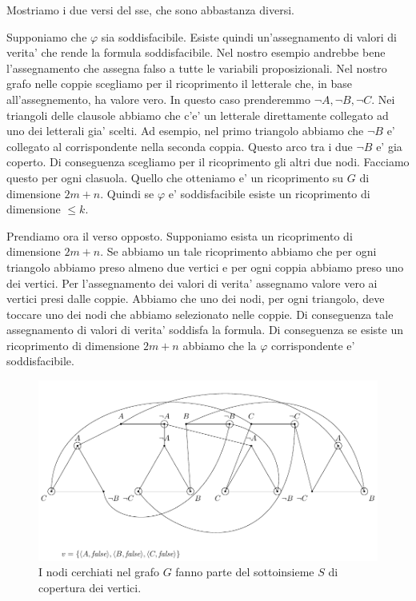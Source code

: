 Mostriamo i due versi del sse, che sono abbastanza diversi.

Supponiamo che $\varphi$ sia soddisfacibile. Esiste quindi un'assegnamento di valori di verita' che
rende la formula soddisfacibile. Nel nostro esempio andrebbe bene l'assegnamento che assegna falso a
tutte le variabili proposizionali. Nel nostro grafo nelle coppie scegliamo per il ricoprimento il
letterale che, in base all'assegnemento, ha valore vero. In questo caso prenderemmo $\lnot A, \lnot
B, \lnot C$. Nei triangoli delle clausole abbiamo che c'e' un letterale direttamente collegato ad
uno dei letterali gia' scelti. Ad esempio, nel primo triangolo abbiamo che $\lnot B$ e' collegato al
corrispondente nella seconda coppia. Questo arco tra i due $\lnot B$ e' gia coperto. Di conseguenza
scegliamo per il ricoprimento gli altri due nodi. Facciamo questo per ogni clasuola. Quello che
otteniamo e' un ricoprimento su $G$ di dimensione $2m + n$. Quindi se $\varphi$ e' soddisfacibile
esiste un ricoprimento di dimensione $\leq k$.

Prendiamo ora il verso opposto. Supponiamo esista un ricoprimento di dimensione $2m + n$. Se abbiamo
un tale ricoprimento abbiamo che per ogni triangolo abbiamo preso almeno due vertici e per ogni
coppia abbiamo preso uno dei vertici. Per l'assegnamento dei valori di verita' assegnamo valore vero
ai vertici presi dalle coppie. Abbiamo che uno dei nodi, per ogni triangolo, deve toccare uno dei
nodi che abbiamo selezionato nelle coppie. Di conseguenza tale assegnamento di valori di verita'
soddisfa la formula. Di conseguenza se esiste un ricoprimento di dimensione $2m + n$ abbiamo che la
$\varphi$ corrispondente e' soddisfacibile.

\begin{figure}[h]
    \begin{center}
        \includegraphics[scale=0.75]{./img/NPClass/SATtoVC3.pdf}
        \caption{I nodi cerchiati nel grafo $G$ fanno parte del sottoinsieme $S$ di copertura dei
        vertici.}
    \end{center}
\end{figure}

